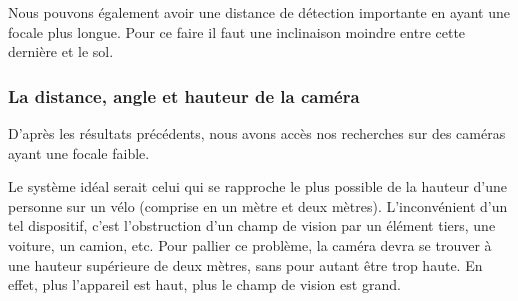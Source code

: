 Nous pouvons également avoir une distance de détection importante en ayant une focale plus longue. Pour ce faire il faut une inclinaison moindre entre cette dernière et le sol.


\subsubsection{La distance, angle et hauteur de la caméra}
\label{sec:camera_distance}
D'après les résultats précédents, nous avons accès nos recherches sur des caméras ayant une focale faible.

Le système idéal serait celui qui se rapproche le plus possible de la hauteur d'une personne sur un vélo (comprise en un mètre et deux mètres). 
L'inconvénient d'un tel dispositif, c'est l'obstruction d'un champ de vision par un élément tiers, une voiture, un camion, etc. Pour pallier ce problème, 
la caméra devra se trouver à une hauteur supérieure de deux mètres, sans pour autant être trop haute. En effet, plus l'appareil est haut, plus le champ de vision est grand.

